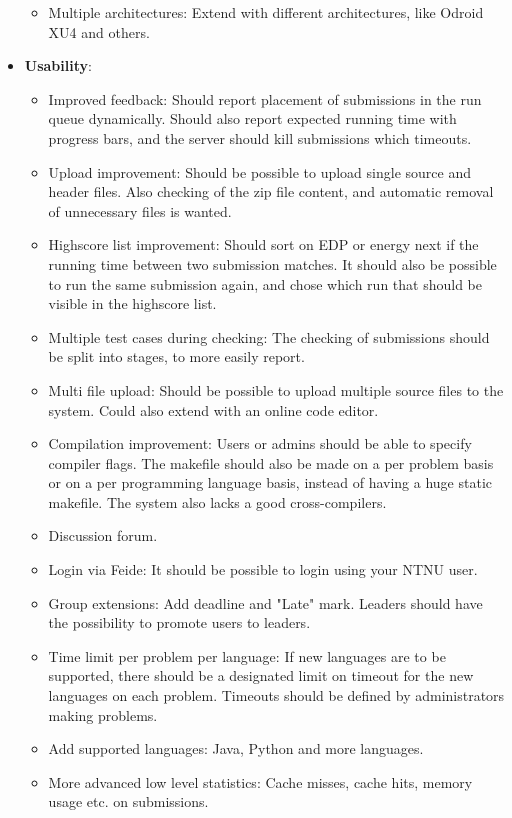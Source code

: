 \begin{itemize}
\begin{itemize}
        \item Multiple architectures: Extend with different architectures, like Odroid XU4 and others.
    \end{itemize}
\item \textbf{Usability}:
    \begin{itemize}
        \item Improved feedback: Should report placement of submissions in the run queue dynamically. Should also report expected running time with progress bars, and the server should kill submissions which timeouts.
        \item Upload improvement: Should be possible to upload single source and header files. Also checking of the zip file content, and automatic removal of unnecessary files is wanted.
        \item Highscore list improvement: Should sort on EDP or energy next if the running time between two submission matches. It should also be possible to run the same submission again, and chose which run that should be visible in the highscore list.
        \item Multiple test cases during checking: The checking of submissions should be split into stages, to more easily report.
        \item Multi file upload: Should be possible to upload multiple source files to the system. Could also extend with an online code editor.
        \item Compilation improvement: Users or admins should be able to specify compiler flags. The makefile should also be made on a per problem basis or on a per programming language basis, instead of having a huge static makefile. The system also lacks a good cross-compilers.
        \item Discussion forum.
        \item Login via Feide: It should be possible to login using your NTNU user.
        \item Group extensions: Add deadline and "Late" mark. Leaders should have the possibility to promote users to leaders.
        \item Time limit per problem per language: If new languages are to be supported, there should be a designated limit on timeout for the new languages on each problem. Timeouts should be defined by administrators making problems.
        \item Add supported languages: Java, Python and more languages.
        \item More advanced low level statistics: Cache misses, cache hits, memory usage etc. on submissions.

\end{itemize}
\end{itemize}
